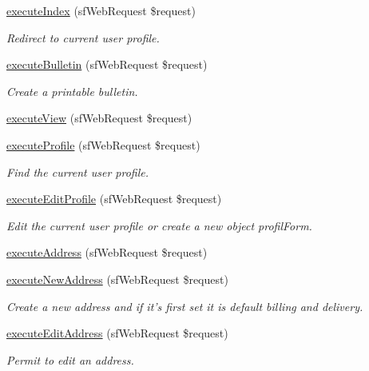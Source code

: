 \begin{DoxyCompactItemize}
\hyperlink{classuser_actions_a948cc911eb1d9f77990be54af3b2080f}{execute\-Index} (sf\-Web\-Request \$request)
\begin{DoxyCompactList}\small\item\em Redirect to current user profile. \end{DoxyCompactList}\item 
\hyperlink{classuser_actions_abfdc0f565591bc7c38a3754ac5e090a8}{execute\-Bulletin} (sf\-Web\-Request \$request)
\begin{DoxyCompactList}\small\item\em Create a printable bulletin. \end{DoxyCompactList}\item 
\hyperlink{classuser_actions_ad61d212fa3f7e8cb4190700a8a670606}{execute\-View} (sf\-Web\-Request \$request)
\item 
\hyperlink{classuser_actions_a8708446f9f99de6a0a8f30c64b2460c3}{execute\-Profile} (sf\-Web\-Request \$request)
\begin{DoxyCompactList}\small\item\em Find the current user profile. \end{DoxyCompactList}\item 
\hyperlink{classuser_actions_a28bc467f5c5fd9e0567ad83032a814c5}{execute\-Edit\-Profile} (sf\-Web\-Request \$request)
\begin{DoxyCompactList}\small\item\em Edit the current user profile or create a new object profil\-Form. \end{DoxyCompactList}\item 
\hyperlink{classuser_actions_ae4726530b0653cb3a10b19167697f222}{execute\-Address} (sf\-Web\-Request \$request)
\item 
\hyperlink{classuser_actions_a205329d430d32cdab40892fca6459afa}{execute\-New\-Address} (sf\-Web\-Request \$request)
\begin{DoxyCompactList}\small\item\em Create a new address and if it's first set it is default billing and delivery. \end{DoxyCompactList}\item 
\hyperlink{classuser_actions_ad98c573cfa4d429ba96b106e46951816}{execute\-Edit\-Address} (sf\-Web\-Request \$request)
\begin{DoxyCompactList}\small\item\em Permit to edit an address. \end{DoxyCompactList}\item 

\end{DoxyCompactItemize}
